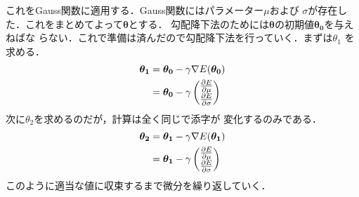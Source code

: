 \documentclass{jlreq}
\begin{document}
			これをGauss関数に適用する．Gauss関数にはパラメーター\(\mu\)および
			\(\sigma\)が存在した．これをまとめてよって\(\bm{\theta}\)とする．
			勾配降下法のためには\(\bm{\theta}\)の初期値\(\bm{\theta_0}\)を与えねばな
			らない．これで準備は済んだので勾配降下法を行っていく．まずは\(\theta_1\)
			を求める．
				\begin{align}
					\bm{\theta_1} &= \bm{\theta_0} - \gamma\nabla E(\bm{\theta_0})\\
					&= \bm{\theta_0}-\gamma
						\begin{pmatrix}
							\pdv{E}{\mu}\\
							\pdv{E}{\sigma}
						\end{pmatrix}
				\end{align}
			次に\(\theta_2\)を求めるのだが，計算は全く同じで添字が
			変化するのみである．
				\begin{align}
					\bm{\theta_2} &= \bm{\theta_1} - \gamma\nabla E(\bm{\theta_1})\\
					&= \bm{\theta_1}-\gamma
						\begin{pmatrix}
							\pdv{E}{\mu}\\
							\pdv{E}{\sigma}
						\end{pmatrix}
				\end{align}
			このように適当な値に収束するまで微分を繰り返していく．
\end{document}
